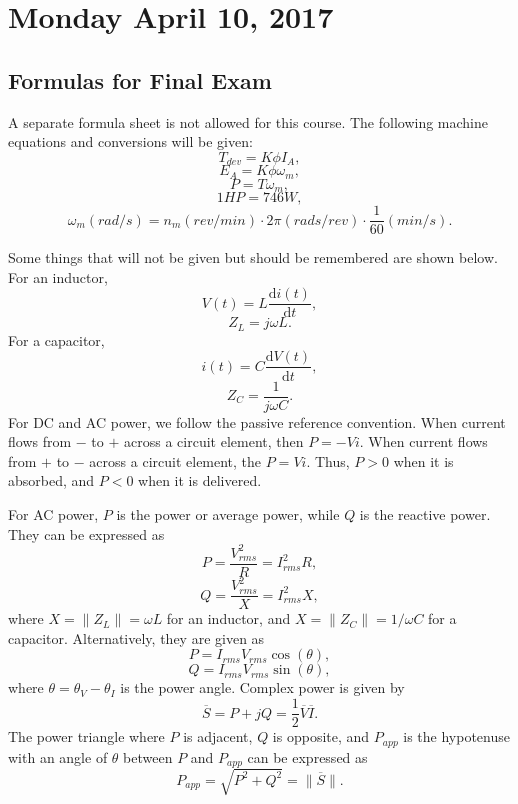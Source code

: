 \documentclass[11pt]{article}
\theoremstyle{plain} %
\theoremstyle{definition}
\theoremstyle{example}
\theoremstyle{remark}
\begin{document}
\section{Monday April 10, 2017}

\subsection{Formulas for Final Exam}
A separate formula sheet is not allowed for this course. The following machine equations and conversions will be given:
$$T_{dev}  =K\phi I_A,$$
$$E_A = K\phi \omega_m,$$
$$P = T\omega_m,$$
$$1HP = 746W,$$
$$\omega_m(rad/s) = n_m(rev/min)\cdot 2\pi(rads/rev) \cdot \frac{1}{60}(min/s).$$

Some things that will not be given but should be remembered are shown below. For an inductor, 
$$V(t) = L\frac{\mathrm d i(t)}{\mathrm d t},$$
$$Z_L = j\omega L.$$
For a capacitor, 
$$i(t) = C\frac{\mathrm d V(t)}{\mathrm d t},$$
$$Z_C = \frac{1}{j \omega C}.$$
For DC and AC power, we follow the passive reference convention. When current flows from $-$ to $+$ across a circuit element, then $P=-Vi$. When current flows from $+$ to $-$ across a circuit element, the $P=Vi$. Thus, $P>0$ when it is absorbed, and $P<0$ when it is delivered. 

For AC power, $P$ is the power or average power, while $Q$ is the reactive power. They can be expressed as 
$$P = \frac{V_{rms}^2}{R} = I_{rms}^2R,$$
$$Q = \frac{V_{rms}^2}{X} = I_{rms}^2X,$$
where $X = \|Z_L\| = \omega L$ for an inductor, and $X = \|Z_C\| = 1/\omega C$ for a capacitor. Alternatively, they are given as 
$$P = I_{rms}V_{rms}\cos(\theta),$$
$$Q= I_{rms}V_{rms}\sin(\theta),$$
where $\theta = \theta_V-\theta_I$ is the power angle. Complex power is given by 
$$\overline S = P + jQ = \frac{1}{2}\overline V \overline I.$$
The power triangle where $P$ is adjacent, $Q$ is opposite, and $P_{app}$ is the hypotenuse with an angle of $\theta$ between $P$ and $P_{app}$ can be expressed as 
$$P_{app} = \sqrt{P^2 +Q^2} = \|\overline S\|.$$
\end{document}
